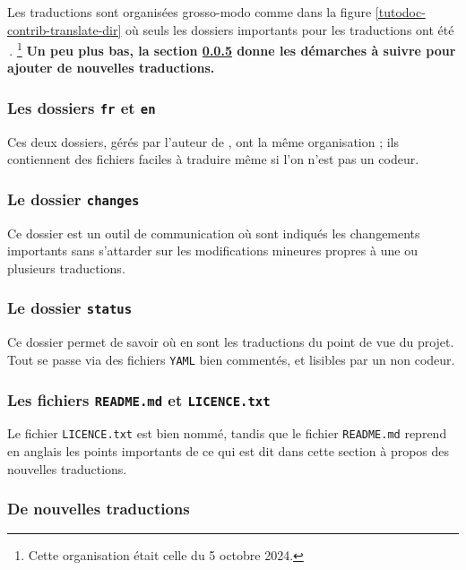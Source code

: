 Les traductions sont organisées grosso-modo comme dans la figure \ref{tutodoc-contrib-translate-dir} où seuls les dossiers importants pour les traductions ont été \,.%
\footnote{
    Cette organisation était celle du 5 octobre 2024.
}
\textbf{Un peu plus bas, la section \ref{tutodoc-contrib-translate} donne les démarches à suivre pour ajouter de nouvelles traductions.}


\subsubsection{Les dossiers \texttt{fr} et \texttt{en}}

Ces deux dossiers, gérés par l'auteur de \thisproj, ont la même organisation ; ils contiennent des fichiers faciles à traduire même si l'on n'est pas un codeur.


\subsubsection{Le dossier \texttt{changes}}

Ce dossier est un outil de communication où sont indiqués les changements importants sans s'attarder sur les modifications mineures propres à une ou plusieurs traductions.



\subsubsection{Le dossier \texttt{status}}

Ce dossier permet de savoir où en sont les traductions du point de vue du projet. Tout se passe via des fichiers \verb#YAML# bien commentés, et lisibles par un non codeur.



\subsubsection{Les fichiers \texttt{README.md} et \texttt{LICENCE.txt}}

Le fichier \texttt{LICENCE.txt} est bien nommé, tandis que le fichier \texttt{README.md} reprend en anglais les points importants de ce qui est dit dans cette section à propos des nouvelles traductions.



\subsubsection{De nouvelles traductions}
\label{tutodoc-contrib-translate}

